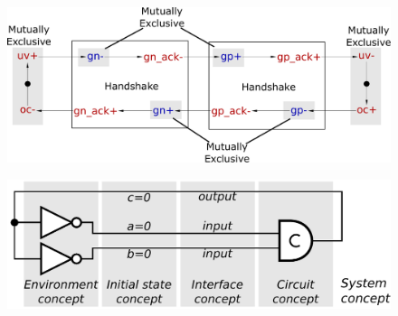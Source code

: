 \documentclass[british, journal]{IEEEtran}
\begin{document}
\begin{figure}[H]
	\begin{centering}
		\includegraphics[scale=0.225]{Images/stg-breakdown}
		\par
		\par\end{centering}
	\vspace{-4mm}
\end{figure}

\begin{figure}[H]
	\begin{centering}
		\includegraphics[scale=0.51]{Images/C-element-with-environment}
		\par\end{centering}
	\vspace{-3mm}
\end{figure}
\end{document}
